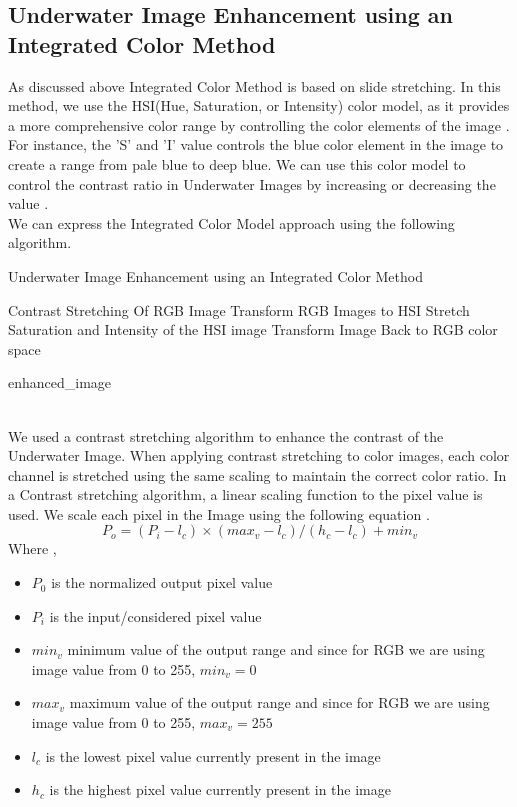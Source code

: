 \documentclass[a4paper,11pt,oneside]{article}
\begin{document}
  \subsection{Underwater Image Enhancement using an Integrated Color Method \cite{4}}
  As discussed above Integrated Color Method is based on slide stretching. In this method, we use the HSI(Hue, Saturation, or Intensity) color model, as it provides a more comprehensive color range by controlling the color elements of the image \cite{4}. For instance, the 'S' and 'I' value controls the blue color element in the image to create a range from pale blue to deep blue. We can use this color model to control the contrast ratio in Underwater Images by increasing or decreasing the value \cite{4}.\\
We can express the Integrated Color Model approach using the following algorithm.
  \begin{algorithm}
	\caption*{Underwater Image Enhancement using an Integrated Color Method \cite{4}}
	\begin{algorithmic}

    \State Contrast Stretching Of RGB Image
    \State Transform RGB Images to HSI 
    \State Stretch Saturation and Intensity of the HSI image  
    \State Transform Image Back to RGB color space
    \State
    
    \Return enhanced\_image
\EndProcedure

\end{algorithmic}
\end{algorithm}\\
We used a contrast stretching algorithm to enhance the contrast of the Underwater Image. When applying contrast stretching to color images, each color channel is stretched using the same scaling to maintain the correct color ratio. In a Contrast stretching algorithm, a linear scaling function to the pixel value is used. We scale each pixel in the Image using the following equation \cite{4}.
$$P_{o} = (P_{i} - l_c) \times (max_v - l_c)  / (h_c - l_c) + min_v$$
Where \cite{4},
\begin{itemize}
\item
$P_{0}$ is the normalized output pixel value
\item
$P_{i}$ is the input/considered pixel value
\item
$min_v$  minimum value of the output range and since for RGB we are using image value from 0 to 255, $min_v = 0$
\item
$max_v$ maximum value of the output range and since for RGB we are using image value from 0 to 255, $max_v = 255$
\item
$l_c$ is the lowest pixel value currently present in the image
\item
$h_c$ is the highest pixel value currently present in the image 
\end{itemize}
\end{document}
